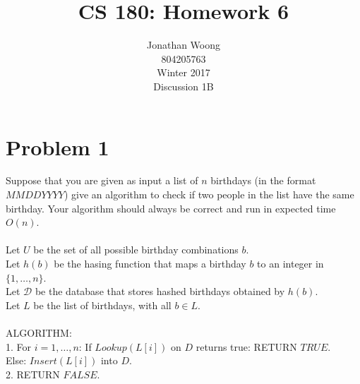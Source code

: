 \documentclass[10pt,letterpaper]{article}
\date{\displaydate{date}}
\newcommand\tab[1][0.5cm]{\hspace*{#1}}
\begin{document}
\title{CS 180: Homework 6}
\author{
	Jonathan Woong\\
	804205763\\
	Winter 2017\\
	Discussion 1B}
\maketitle
\pagebreak


\section{Problem 1}
Suppose that you are given as input a list of $n$ birthdays (in the format $MMDDYYYY$) give an algorithm to check if two people in the list have the same birthday. Your algorithm should always be correct and run in expected time $O(n)$.\\\\
Let $U$ be the set of all possible birthday combinations $b$.\\
Let $h(b)$ be the hasing function that maps a birthday $b$ to an integer in $\{1,\dots,n\}$.\\
Let $\mathcal{D}$ be the database that stores hashed birthdays obtained by $h(b)$.\\
Let $L$ be the list of birthdays, with all $b \in L$.\\\\
\textsc{ALGORITHM}:\\
1. For $i=1,\dots,n$:
\tab If $Lookup(L[i])$ on $D$ returns true: \textsc{RETURN} $TRUE$.\\
\tab Else: $Insert(L[i])$ into $D$.\\
2. \textsc{RETURN} $FALSE$.\\

\pagebreak

\end{document}
